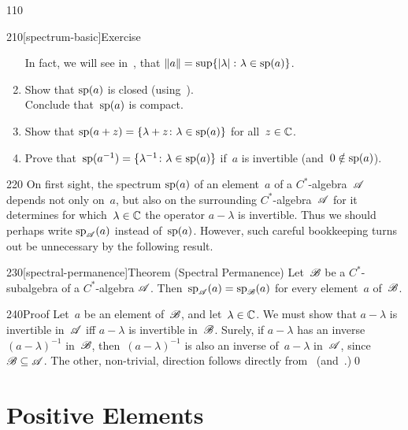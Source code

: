 \begin{parsec}{110}
\begin{point}{210}[spectrum-basic]{Exercise}
\begin{enumerate}
In fact, we will see in~,
that $\|a\|=\sup\{\left|\lambda\right|\colon \lambda\in \mathrm{sp}(a)\}$.
\item
Show that $\mathrm{sp}(a)$ is closed (using~).\\
Conclude that~$\mathrm{sp}(a)$ is compact.
\item
Show that $\mathrm{sp}(a+z)=\{\lambda+z\colon \lambda\in\mathrm{sp}(a)\}$
for all~$z\in \mathbb{C}$.
\item
Prove that~$\mathrm{sp}(a^{-1})=\{\lambda^{-1}\colon \lambda\in \mathrm{sp}(a)\}$
if~$a$ is invertible (and~$0\notin \mathrm{sp}(a)$).
\end{enumerate}%
\spacingfix{}%
\end{point}%
\begin{point}{220}%
On first sight,
the spectrum $\mathrm{sp}(a)$
of an element~$a$ of a $C^*$-algebra~$\mathscr{A}$ 
depends not only on~$a$,
but also on the surrounding $C^*$-algebra~$\mathscr{A}$ for it determines
for which~$\lambda\in\mathbb{C}$ the operator $a-\lambda$ is invertible.
Thus we should perhaps write $\mathrm{sp}_{\mathscr{A}}(a)$ instead
of~$\mathrm{sp}(a)$.
However, such careful bookkeeping turns out 
be unnecessary
by the following result.
\end{point}
\begin{point}{230}[spectral-permanence]{Theorem (Spectral Permanence)}%
%
Let~$\mathscr{B}$ be a $C^*$-subalgebra of a $C^*$-algebra $\mathscr{A}$.
Then~$\mathrm{sp}_{\mathscr{A}}(a)=\mathrm{sp}_{\mathscr{B}}(a)$
for every element~$a$ of~$\mathscr{B}$.
\begin{point}{240}{Proof}%
Let~$a$ be an element of~$\mathscr{B}$,
and let~$\lambda\in \mathbb{C}$.
We must show that $a-\lambda$ is invertible in~$\mathscr{A}$
iff $a-\lambda$ is invertible in~$\mathscr{B}$.
Surely,
if $a-\lambda$ has an inverse $(a-\lambda)^{-1}$ in~$\mathscr{B}$,
then~$(a-\lambda)^{-1}$ is also an inverse of~$a-\lambda$ in~$\mathscr{A}$,
since~$\mathscr{B}\subseteq \mathscr{A}$.
The other, non-trivial, direction follows
    directly from~ 
    (and~.)\qed%
\end{point}
\end{point}
\end{parsec}
\section{Positive Elements}
